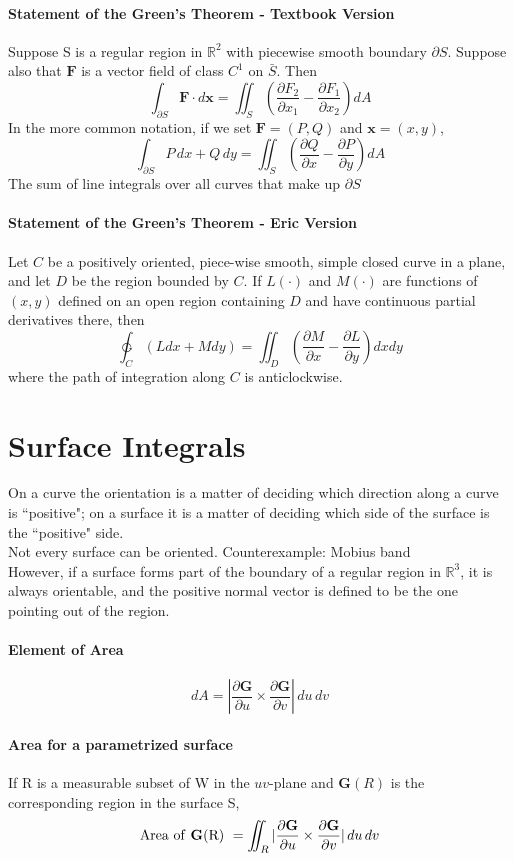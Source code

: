 \documentclass[11pt]{article}
\newcommand{\tb}[1]{\textbf{#1}}
\newcommand{\real}[0]{\mathbb{R}}
\newcommand{\vx}[0]{\tb{x}}
\begin{document}
\paragraph{Statement of the Green's Theorem - Textbook Version}
Suppose S is a regular region in $\real^2$ with piecewise smooth boundary $\partial S$. Suppose also that $\tb{F}$ is a vector field of class $C^1$ on $\bar{S}$. Then
$$\int_{\partial S}\tb{F}\cdot d\vx = \iint_S(\frac{\partial F_2}{\partial x_1} - \frac{\partial F_1}{\partial x_2})dA$$
In the more common notation, if we set $\tb{F} = (P,Q)$ and $\vx = (x,y)$,
$$\int_{\partial S}P \, dx + Q \, dy = \iint_S(\frac{\partial Q}{\partial x} - \frac{\partial P}{\partial y})dA$$
The sum of line integrals over all curves that make up $\partial S$

\paragraph{Statement of the Green's Theorem - Eric Version} Let $C$ be a positively oriented, piece-wise smooth, simple closed curve in a plane, and let $D$ be the region bounded by $C$. If $L(\cdot)$ and $M(\cdot)$ are functions of $(x, y)$ defined on an open region containing $D$ and have continuous partial derivatives there, then
\begin{equation*}
    \ointctrclockwise_C \left(Ldx + Mdy\right) = \iint_D \left(\frac{\partial M}{\partial x} - \frac{\partial L}{\partial y}\right) dxdy
\end{equation*}
where the path of integration along $C$ is anticlockwise.

\section{Surface Integrals}
On a curve the orientation is a matter of deciding which direction along a curve is ``positive"; on a surface it is a matter of deciding which side of the surface is the ``positive" side. \\
Not every surface can be oriented. Counterexample: Mobius band \\
However, if a surface forms part of the boundary of a regular region in $\real^3$, it is always orientable, and the positive normal vector is defined to be the one pointing out of the region.
\paragraph{Element of Area}
$$dA = |\frac{\partial \tb{G}}{\partial u} \times \frac{\partial \tb{G}}{\partial v}| \, du\, dv$$
\paragraph{Area for a parametrized surface}
If R is a measurable subset of W in the $uv$-plane and $\tb{G}(R)$ is the corresponding region in the surface S,
$$\mbox{Area of \tb{G}(R) } = \iint_R|\frac{\partial \tb{G}}{\partial u} \times \frac{\partial \tb{G}}{\partial v}| \, du\, dv$$
\end{document}
